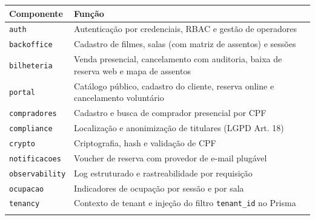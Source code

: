 {\footnotesize
\begin{tabularx}{\textwidth}{L{2.29cm} >{\hsize\sloppy\arraybackslash}X}
\toprule
{}
\textbf{Componente} & \textbf{Função} \\
\midrule
{}
\texttt{auth} & Autenticação por credenciais, RBAC e gestão de operadores \\
\midrule
\texttt{backoffice} & Cadastro de filmes, salas (com matriz de assentos) e sessões \\
\midrule
\texttt{bilheteria} & Venda presencial, cancelamento com auditoria, baixa de reserva web e mapa de assentos \\
\midrule
\texttt{portal} & Catálogo público, cadastro do cliente, reserva online e cancelamento voluntário \\
\midrule
\texttt{compradores} & Cadastro e busca de comprador presencial por CPF \\
\midrule
\texttt{compliance} & Localização e anonimização de titulares (LGPD Art. 18) \\
\midrule
\texttt{crypto} & Criptografia, hash e validação de CPF \\
\midrule
\texttt{notificacoes} & Voucher de reserva com provedor de e-mail plugável \\
\midrule
\texttt{observability} & Log estruturado e rastreabilidade por requisição \\
\midrule
\texttt{ocupacao} & Indicadores de ocupação por sessão e por sala \\
\midrule
\texttt{tenancy} & Contexto de tenant e injeção do filtro \texttt{tenant\_id} no Prisma \\
\bottomrule
\end{tabularx}%
}
